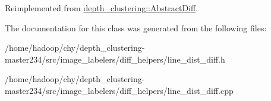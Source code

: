 Reimplemented from \hyperlink{classdepth__clustering_1_1AbstractDiff_a5500c82f3e6800922ba6fc6c22c6d0bf}{depth\-\_\-clustering\-::\-Abstract\-Diff}.



The documentation for this class was generated from the following files\-:\begin{DoxyCompactItemize}
\item 
/home/hadoop/chy/depth\-\_\-clustering-\/master234/src/image\-\_\-labelers/diff\-\_\-helpers/line\-\_\-dist\-\_\-diff.\-h\item 
/home/hadoop/chy/depth\-\_\-clustering-\/master234/src/image\-\_\-labelers/diff\-\_\-helpers/line\-\_\-dist\-\_\-diff.\-cpp\end{DoxyCompactItemize}
